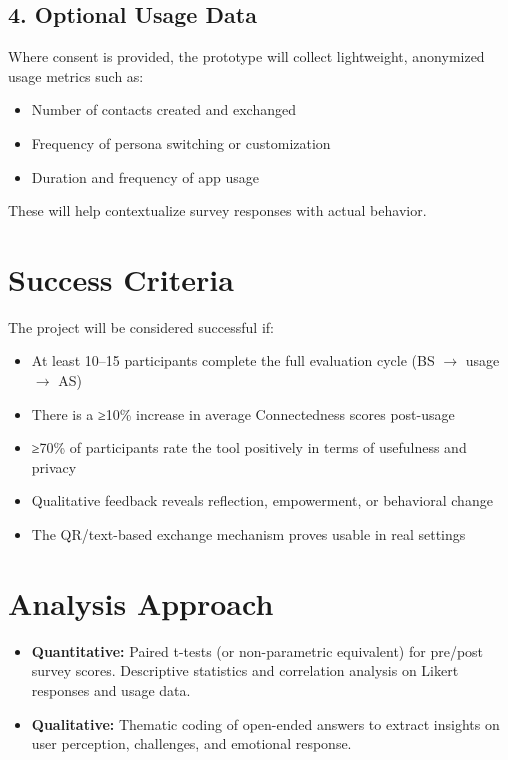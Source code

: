 \documentclass{imc-inf}
\begin{document}
\subsection*{4. Optional Usage Data}
Where consent is provided, the prototype will collect lightweight, anonymized usage metrics such as:
\begin{itemize}
  \item Number of contacts created and exchanged
  \item Frequency of persona switching or customization
  \item Duration and frequency of app usage
\end{itemize}
These will help contextualize survey responses with actual behavior.

\section{Success Criteria}

The project will be considered successful if:

\begin{itemize}
  \item At least 10--15 participants complete the full evaluation cycle (BS $\rightarrow$ usage $\rightarrow$ AS)
  \item There is a ≥10\% increase in average Connectedness scores post-usage
  \item ≥70\% of participants rate the tool positively in terms of usefulness and privacy
  \item Qualitative feedback reveals reflection, empowerment, or behavioral change
  \item The QR/text-based exchange mechanism proves usable in real settings
\end{itemize}

\section{Analysis Approach}

\begin{itemize}
  \item \textbf{Quantitative:} Paired t-tests (or non-parametric equivalent) for pre/post survey scores. Descriptive statistics and correlation analysis on Likert responses and usage data.
  \item \textbf{Qualitative:} Thematic coding of open-ended answers to extract insights on user perception, challenges, and emotional response.
\end{itemize}
\end{document}
